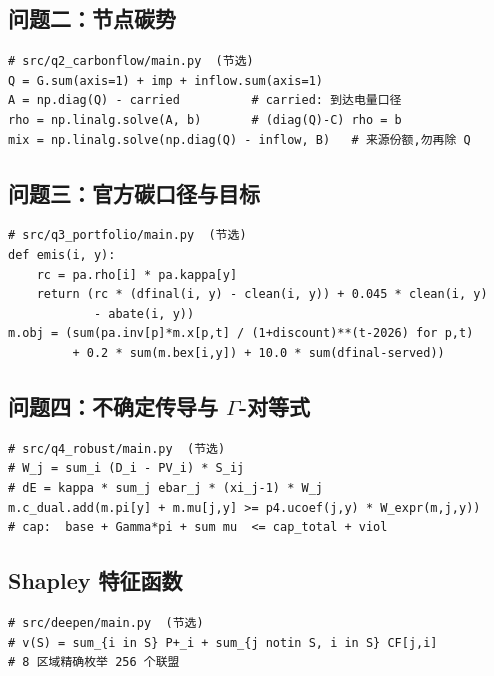 \documentclass[UTF8,a4paper,zihao=-4,fontset=fandol]{ctexart}
\begin{document}
\subsection{问题二：节点碳势}
\begin{lstlisting}
# src/q2_carbonflow/main.py  (节选)
Q = G.sum(axis=1) + imp + inflow.sum(axis=1)
A = np.diag(Q) - carried          # carried: 到达电量口径
rho = np.linalg.solve(A, b)       # (diag(Q)-C) rho = b
mix = np.linalg.solve(np.diag(Q) - inflow, B)   # 来源份额,勿再除 Q
\end{lstlisting}

\subsection{问题三：官方碳口径与目标}
\begin{lstlisting}
# src/q3_portfolio/main.py  (节选)
def emis(i, y):
    rc = pa.rho[i] * pa.kappa[y]
    return (rc * (dfinal(i, y) - clean(i, y)) + 0.045 * clean(i, y)
            - abate(i, y))
m.obj = (sum(pa.inv[p]*m.x[p,t] / (1+discount)**(t-2026) for p,t)
         + 0.2 * sum(m.bex[i,y]) + 10.0 * sum(dfinal-served))
\end{lstlisting}

\subsection{\texorpdfstring{问题四：不确定传导与 $\Gamma$-对等式}{问题四：不确定传导与鲁棒对等式}}
\begin{lstlisting}
# src/q4_robust/main.py  (节选)
# W_j = sum_i (D_i - PV_i) * S_ij
# dE = kappa * sum_j ebar_j * (xi_j-1) * W_j
m.c_dual.add(m.pi[y] + m.mu[j,y] >= p4.ucoef(j,y) * W_expr(m,j,y))
# cap:  base + Gamma*pi + sum mu  <= cap_total + viol
\end{lstlisting}

\subsection{Shapley 特征函数}
\begin{lstlisting}
# src/deepen/main.py  (节选)
# v(S) = sum_{i in S} P+_i + sum_{j notin S, i in S} CF[j,i]
# 8 区域精确枚举 256 个联盟
\end{lstlisting}
\end{document}
